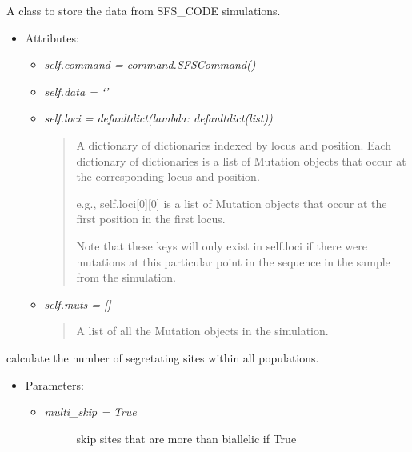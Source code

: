 \documentclass[letterpaper,10pt,english]{sphinxmanual}
\begin{document}
\begin{fulllineitems}
\label{index:sfs.Simulation}
A class to store the data from SFS\_CODE simulations.
\begin{itemize}
\item {} 
Attributes:
\begin{itemize}
\item {} 
\emph{self.command = command.SFSCommand()}

\item {} 
\emph{self.data = `'}

\item {} 
\emph{self.loci = defaultdict(lambda: defaultdict(list))}
\begin{quote}

A dictionary of dictionaries indexed by locus and position.
Each dictionary of dictionaries is a list of Mutation
objects that occur at the corresponding locus and position.

e.g., self.loci{[}0{]}{[}0{]} is a list of Mutation objects that
occur at the first position in the first locus.

Note that these keys will only exist in self.loci if there
were mutations at this particular point in the sequence
in the sample from the simulation.
\end{quote}

\item {} 
\emph{self.muts = {[}{]}}
\begin{quote}

A list of all the Mutation objects in the simulation.
\end{quote}

\end{itemize}

\end{itemize}

\begin{fulllineitems}
\label{index:sfs.Simulation.calc_S}
calculate the number of segretating sites within all
populations.
\begin{itemize}
\item {} 
Parameters:
\begin{itemize}
\item {} \begin{description}
\item[{\emph{multi\_skip = True}}] \leavevmode
skip sites that are more than biallelic if True


\end{description}
\end{itemize}
\end{itemize}
\end{fulllineitems}
\end{fulllineitems}
\end{document}
